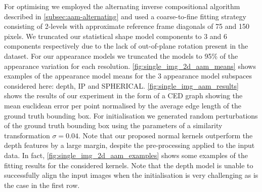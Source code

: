 For optimising we employed the alternating inverse
compositional algorithm described in \cref{subsec:aam-alternating} and used a
coarse-to-fine fitting strategy consisting of 2-levels with approximate
reference frame diagonals of 75 and 150 pixels. We truncated our statistical
shape model components to 3 and 6 components respectively due to the lack
of out-of-plane rotation present in the dataset. For our appearance models
we truncated the models to 95\% of the appearance variation for each resolution.
\cref{fig:single_img_2d_aam_means} shows examples of the appearance model
means for the 3 appearance model subspaces considered here: depth, IP and
SPHERICAL. \cref{fig:single_img_aam_results} shows the results of our
experiment in the form of a CED graph showing the mean euclidean error
per point normalised by the average edge length of the ground truth
bounding box. For initialisation we generated random perturbations of the
ground truth bounding box using the parameters of a similarity transformation
$\sigma = 0.04$. Note that our proposed normal kernels outperform the depth
features by a large margin, despite the pre-processing applied to the input
data. In fact, \cref{fig:single_img_2d_aam_examples} shows some examples
of the fitting results for the considered kernels. Note that the depth model
is unable to successfully align the input images when the initialisation is
very challenging as is the case in the first row.
